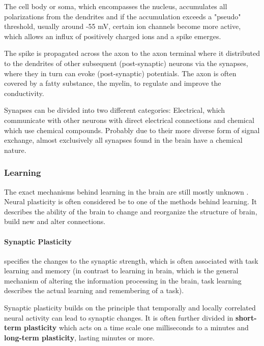 The cell body or soma, which encompasses the nucleus, accumulates all polarizations from the dendrites and if the accumulation exceeds a "pseudo" threshold, usually around -55 mV, certain ion channels become more active, which allows an influx of positively charged ions and a spike emerges.

The spike is propagated across the axon to the axon terminal where it distributed to the dendrites of other subsequent (post-synaptic) neurons via the synapses, where they in turn can evoke (post-synaptic) potentials.
The axon is often covered by a fatty substance, the myelin, to regulate and improve the conductivity.

Synapses can be divided into two different categories: Electrical, which communicate with other neurons with direct electrical connections and chemical which use chemical compounds.
Probably due to their more diverse form of signal exchange, almost exclusively all synapses found in the brain have a chemical nature.

\subsubsection{Learning}

The exact mechanisms behind learning in the brain are still mostly unknown \cite{gerstner2014neuronal}\cite{Byrne1997}\cite{Markram2012}.
Neural plasticity is often considered be to one of the methods behind learning. 
It describes the ability of the brain to change and reorganize the structure of brain, build new and alter connections.  

\paragraph{Synaptic Plasticity} specifies the changes to the synaptic strength, which is often associated with task learning and memory (in contrast to learning in brain, which is the general mechanism of altering the information processing in the brain, task learning describes the actual learning and remembering of a task). 

Synaptic plasticity builds on the principle that temporally and locally correlated neural activity  can lead to synaptic changes.
It is often further divided in \textbf{short-term plasticity} which acts on a time scale one milliseconds to a minutes and \textbf{long-term plasticity}, lasting minutes or more.


